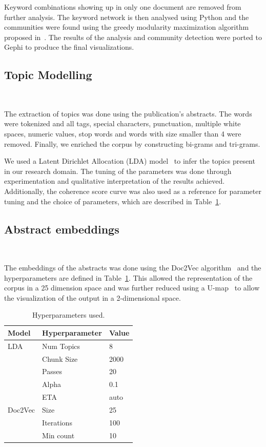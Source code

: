\documentclass[parskip=full]{scrartcl}
\begin{document}
Keyword combinations showing up in only one document are removed from further
analysis. The keyword network is then analysed using Python and the
communities were found using the greedy modularity maximization algorithm
proposed in~\cite{Clauset2004}. The results of the analysis and community
detection were ported to Gephi to produce the final visualizations.

\subsection{Topic Modelling}~\label{sec:topic_modelling}

The extraction of topics was done using the publication's abstracts. The words
were tokenized and all tags, special characters, punctuation, multiple white
spaces, numeric values, stop words and words with size smaller than 4 were
removed. Finally, we enriched the corpus by constructing bi-grams and
tri-grams.

We used a Latent Dirichlet Allocation (LDA) model~\cite{Pritchard2000} to
infer the topics present in our research domain. The tuning of the parameters
was done through experimentation and qualitative interpretation of the results
achieved. Additionally, the coherence score curve was also used as a reference for
parameter tuning and the choice of parameters, which are described in
Table~\ref{tab:hyperparameters}. 

\subsection{Abstract embeddings}~\label{sec:abstract_embeddings}

The embeddings of the abstracts was done using the Doc2Vec
algorithm~\cite{Le2014} and the hyperparameters are defined in
Table~\ref{tab:hyperparameters}. This allowed the representation of the corpus
in a 25 dimension space and was further reduced using a
U-map~\cite{Mcinnes2018} to allow the visualization of the output in a
2-dimensional space.

\begin{table}[H]
    \centering
    \begin{tabular}{lll}
        \toprule
        Model   &   Hyperparameter  &   Value \\
        \midrule
        LDA     &   Num Topics      &   8     \\
                &   Chunk Size      &   2000  \\
                &   Passes          &   20    \\
                &   Alpha           &   0.1   \\
                &   ETA             &   auto  \\
        \midrule
        Doc2Vec &   Size            &   25    \\
                &   Iterations      &   100   \\
                &   Min count       &   10    \\
        \bottomrule
    \end{tabular}
    \caption{Hyperparameters used.}~\label{tab:hyperparameters}
\end{table}
\end{document}
